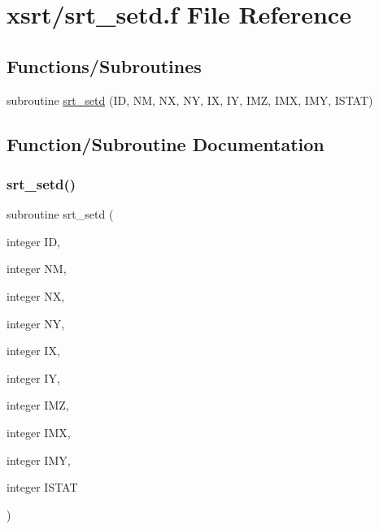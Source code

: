\hypertarget{srt__setd_8f}{}\section{xsrt/srt\+\_\+setd.f File Reference}
\label{srt__setd_8f}
\subsection*{Functions/\+Subroutines}
\begin{DoxyCompactItemize}
\item 
subroutine \hyperlink{srt__setd_8f_a3c1ef39ca35b1fb44c4489f3c9b04b9a}{srt\+\_\+setd} (ID, NM, NX, NY, IX, IY, I\+MZ, I\+MX, I\+MY, I\+S\+T\+AT)
\end{DoxyCompactItemize}


\subsection{Function/\+Subroutine Documentation}
\mbox{\label{srt__setd_8f_a3c1ef39ca35b1fb44c4489f3c9b04b9a}} 
\subsubsection{\texorpdfstring{srt\+\_\+setd()}{srt\_setd()}}
{\footnotesize\ttfamily subroutine srt\+\_\+setd (\begin{DoxyParamCaption}\item[{integer}]{ID,  }\item[{integer}]{NM,  }\item[{integer}]{NX,  }\item[{integer}]{NY,  }\item[{integer}]{IX,  }\item[{integer}]{IY,  }\item[{integer}]{I\+MZ,  }\item[{integer}]{I\+MX,  }\item[{integer}]{I\+MY,  }\item[{integer}]{I\+S\+T\+AT }\end{DoxyParamCaption})}

